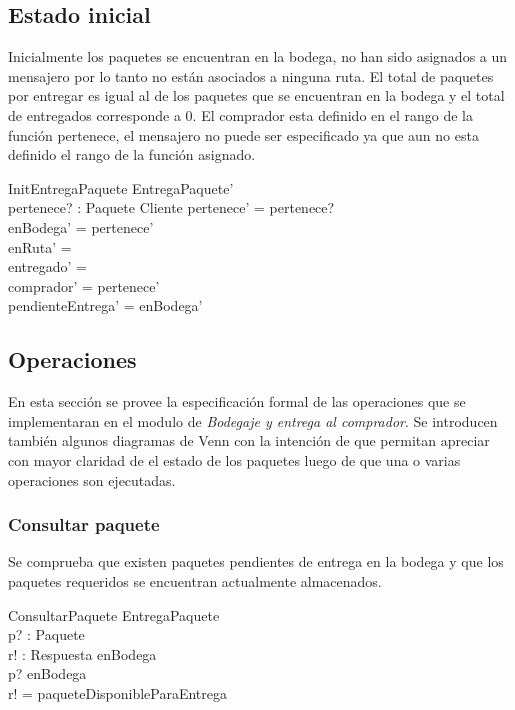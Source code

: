 \documentclass[12pt,a4paper]{article}
\begin{document}
\subsection{Estado inicial}

Inicialmente los paquetes se encuentran en la bodega, no han sido asignados a un mensajero por lo tanto no están asociados a ninguna ruta. El total de paquetes por entregar es igual al de los paquetes que se encuentran en la bodega y el total de entregados corresponde a 0. El comprador esta definido en el rango de la función pertenece, el mensajero no puede ser especificado ya que aun no esta definido el rango de la función asignado.

\begin{schema}{InitEntregaPaquete}
EntregaPaquete'\\
pertenece? : Paquete \pfun Cliente
\where
pertenece' = pertenece?\\
enBodega' = \dom pertenece'\\
enRuta' = \emptyset\\
entregado' = \emptyset\\
comprador' = \ran pertenece'\\
pendienteEntrega' = enBodega'
\end{schema}

\subsection{Operaciones}

En esta sección se provee la especificación formal de las operaciones que se implementaran en el modulo de \textit{Bodegaje y entrega al comprador}. Se introducen también algunos diagramas de Venn con la intención de que permitan apreciar con mayor claridad de el estado de los paquetes luego de que una o varias operaciones son ejecutadas.

\subsubsection{Consultar paquete}

Se comprueba que existen paquetes pendientes de entrega en la bodega y que los paquetes requeridos se encuentran actualmente almacenados.

\begin{schema}{ConsultarPaquete}
\Xi EntregaPaquete\\
p? : Paquete\\
r! : Respuesta
\where
enBodega \neq \emptyset\\
p? \in enBodega\\
r! = paqueteDisponibleParaEntrega
\end{schema}
\end{document}
